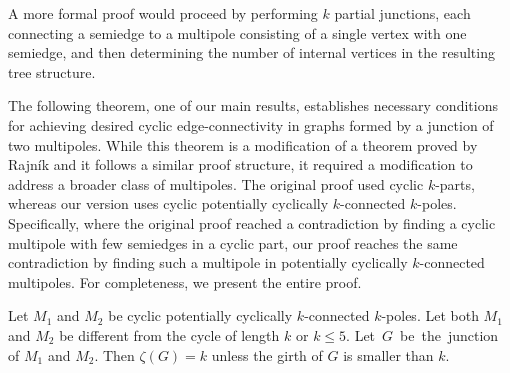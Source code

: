 \documentclass[12pt, twoside]{book}
\begin{document}
A more formal proof would proceed by performing $k$ partial junctions, each connecting a semiedge to a multipole consisting of a single vertex with one semiedge, and then determining the number of internal vertices in the resulting tree structure.

The following theorem, one of our main results, establishes necessary conditions for achieving desired cyclic edge-connectivity in graphs formed by a junction of two multipoles. While this theorem is a modification of a theorem proved by Rajník \mbox{\cite[Theorem 5.2]{Rajnik_phd}} and it follows a similar proof structure, it required a modification to address a broader class of multipoles. The original proof used cyclic $k$-parts, whereas our version uses cyclic potentially cyclically $k$-connected $k$-poles. Specifically, where the original proof reached a contradiction by finding a cyclic multipole with few semiedges in a cyclic part, our proof reaches the same contradiction by finding such a multipole in potentially cyclically $k$-connected multipoles. For completeness, we present the entire proof.

\begin{theorem}\label{th:junction-of-kpoles-cyclic-edge-connectivity}
	Let $M_1$ and $M_2$ be cyclic potentially cyclically $k$-connected $k$-poles. Let both $M_1$ and $M_2$ be different from the cycle of length $k$ or $k\leq 5$. \mbox{Let $G$ be the junction} of $M_1$ and $M_2$. Then $\zeta(G)=k$ unless the girth of $G$ is smaller than $k$.
\end{theorem}

\end{document}
